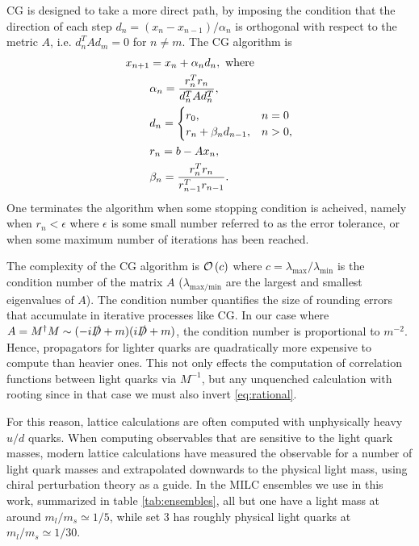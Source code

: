 CG is designed to take a more direct path, by imposing the condition that the direction of each step $d_n=(x_n-x_{n-1})/\alpha_n$ is orthogonal with respect to the metric $A$, i.e. $d^T_n A d_m = 0$ for $n\neq m$. The CG algorithm is
\begin{align}
  \nonumber
  x_{n+1} &= x_n + \alpha_n d_n, \text{ where } \\
  \nonumber
  &\alpha_n = {r^T_n r_n \over d^T_n A d_n^T}, \\
  \nonumber
  &d_n=
  \begin{cases}
    r_0, &  n=0 \\
    r_{n} + \beta_n d_{n-1}, & n>0,
  \end{cases} \\
  \nonumber
  &r_n = b - Ax_n, \\
  &\beta_n = {r^T_n r_n \over r^T_{n-1}r_{n-1}}.
  \label{eq:CG}
\end{align}
One terminates the algorithm when some stopping condition is acheived, namely when $r_n < \epsilon$ where $\epsilon$ is some small number referred to as the error tolerance, or when some maximum number of iterations has been reached.

The complexity of the CG algorithm is $\mathcal{O}\left( c \right)$ where $c=\lambda_{\text{max}}/\lambda_{\text{min}}$ is the condition number of the matrix $A$ ($\lambda_{\text{max/min}}$ are the largest and smallest eigenvalues of $A$). The condition number quantifies the size of rounding errors that accumulate in iterative processes like CG. In our case where $A=M^{\dagger}M  \sim(-i\slashed{D}+m)(i\slashed{D}+m)$, the condition number is proportional to $m^{-2}$. Hence, propagators for lighter quarks are quadratically more expensive to compute than heavier ones. This not only effects the computation of correlation functions between light quarks via $M^{-1}$, but any unquenched calculation with rooting since in that case we must also invert \eqref{eq:rational}.

For this reason, lattice calculations are often computed with unphysically heavy $u/d$ quarks. When computing observables that are sensitive to the light quark masses, modern lattice calculations have measured the observable for a number of light quark masses and extrapolated downwards to the physical light mass, using chiral perturbation theory as a guide. In the MILC ensembles we use in this work, summarized in table \ref{tab:ensembles}, all but one have a light mass at around $m_l/m_s \simeq 1/5$, while set 3 has roughly physical light quarks at $m_l/m_s \simeq 1/30$.


